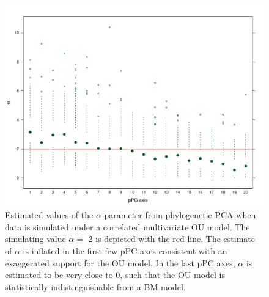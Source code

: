 \documentclass[12pt,twoside]{article}
\begin{document}
\begin{figure}[p]
\centering
\includegraphics[scale=0.65]{fig/alpha-est-corr.pdf}
\caption[Estimates of the $\alpha$ parameter from phylogenetic PCA on correlated OU]{Estimated values of the $\alpha$ parameter from phylogenetic PCA when data is simulated under a correlated multivariate OU model. The simulating value $\alpha=$ 2 is depicted with the red line. The estimate of $\alpha$ is inflated in the first few pPC axes consistent with an exaggerated support for the OU model. In the last pPC axes, $\alpha$ is estimated to be very close to 0, such that the OU model is statistically indistinguishable from a BM model.}
\label{alpha-cor}
\end{figure}
\end{document}

